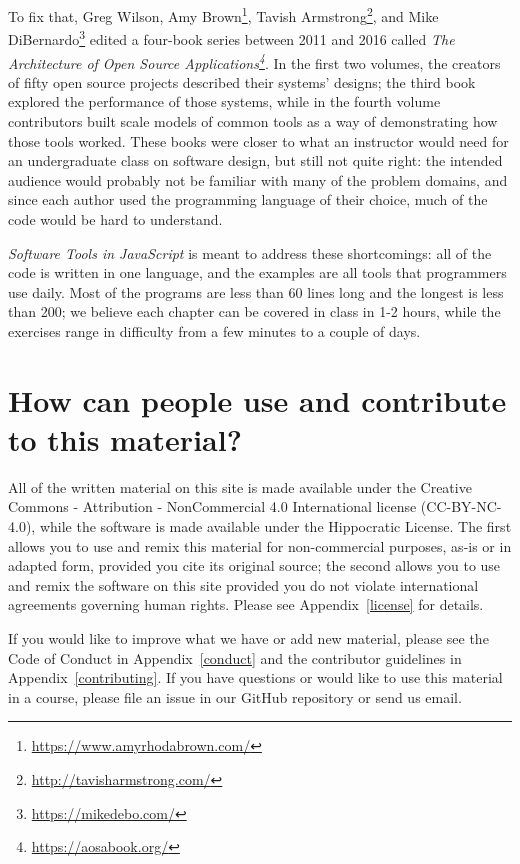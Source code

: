 \documentclass[krantzl]{krantz}
\newcommand{\appref}[1]{Appendix~\ref{#1}}
\newcommand{\hreffoot}[2]{{#1}\footnote{\href{#2}{#2}}}
\begin{document}
To fix that,
Greg Wilson, \hreffoot{Amy Brown}{https://www.amyrhodabrown.com/},
\hreffoot{Tavish Armstrong}{http://tavisharmstrong.com/},
and \hreffoot{Mike DiBernardo}{https://mikedebo.com/}
edited a four-book series between 2011 and 2016 called \emph{\hreffoot{The Architecture of Open Source Applications}{https://aosabook.org/}}.
In the first two volumes,
the creators of fifty open source projects described their systems' designs;
the third book explored the performance of those systems,
while in the fourth volume contributors built scale models of common tools
as a way of demonstrating how those tools worked.
These books were closer to what an instructor would need for an undergraduate class on software design,
but still not quite right:
the intended audience would probably not be familiar with many of the problem domains,
and since each author used the programming language of their choice,
much of the code would be hard to understand.


\emph{Software Tools in JavaScript} is meant to address these shortcomings:
all of the code is written in one language,
and the examples are all tools that programmers use daily.
Most of the programs are less than 60 lines long and the longest is less than 200;
we believe each chapter can be covered in class in 1-2 hours,
while the exercises range in difficulty from a few minutes to a couple of days.

\section{How can people use and contribute to this material?}\label{introduction-use}


All of the written material on this site is made available under the Creative
Commons - Attribution - NonCommercial 4.0 International license (CC-BY-NC-4.0),
while the software is made available under the Hippocratic License.  The first
allows you to use and remix this material for non-commercial purposes, as-is or
in adapted form, provided you cite its original source; the second allows you to
use and remix the software on this site provided you do not violate
international agreements governing human rights. Please see \appref{license}
for details.


If you would like to improve what we have or add new material, please see the
Code of Conduct in \appref{conduct} and the contributor guidelines in
\appref{contributing}.  If you have questions or would like to use this material in
a course, please file an issue in our GitHub repository or send us email.
\end{document}
